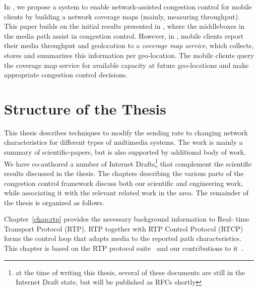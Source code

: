 In , we propose a system to enable network-assisted
congestion control for mobile clients by building a network coverage maps
(mainly, measuring throughput). This paper builds on the initial results
presented in , where the middleboxes in the media path assist
in congestion control. However, in , mobile clients report
their media throughput and geolocation to a \emph{coverage map service}, which
collects, stores and summarizes this information per geo-location. The mobile
clients query the coverage map service for available capacity at future
geo-locations and make appropriate congestion control decisions.

\section{Structure of the Thesis}

This thesis describes techniques to modify the sending rate to changing
network characteristics for different types of multimedia systems. The work is
mainly a summary of scientific-papers, but is also supported by additional
body of work. We have co-authored a number of Internet Drafts\footnote{at the
time of writing this thesis, several of these documents are still in the
Internet Draft state, but will be published as RFCs shortly} that complement
the scientific results discussed in the thesis. The chapters describing the
various parts of the congestion control framework discuss both our scientific
and engineering work, while associating it with the relevant related work in
the area. The remainder of the thesis is organized as follows.



Chapter~\ref{chap:rtp} provides the necessary background information to Real-
time Transport Protocol (RTP). RTP together with RTP Control Protocol (RTCP)
forms the control loop that adapts media to the reported path characteristics.
This chapter is based on the RTP protocol suite~\cite{rfc3550, rfc4585,
rfc3611, rfc5104, rfc5506} and our contributions to
it~\cite{rfc7097, rfc7005, draft.xr.bytes.discarded}.

